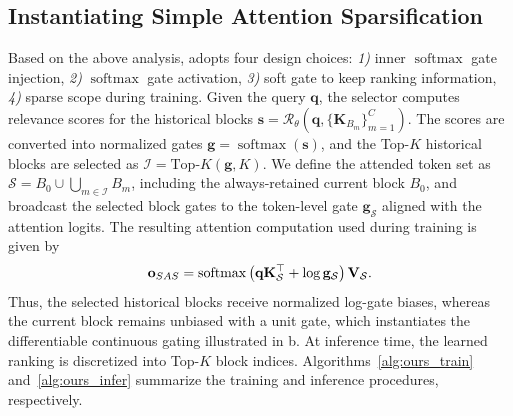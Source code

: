 \subsection{Instantiating Simple Attention Sparsification}
\label{sec:ranksparse}

Based on the above analysis, \our adopts four design choices: \emph{1)} inner $\operatorname{softmax}$ gate injection, \emph{2)} $\operatorname{softmax}$ gate activation, \emph{3)} soft gate to keep ranking information, \emph{4)} sparse scope during training.
Given the query $\mathbf{q}$, the selector computes relevance scores for the historical blocks
$\mathbf{s}
=
\mathcal{R}_{\theta}
\left(
\mathbf{q},
\{\mathbf{K}_{B_m}\}_{m=1}^{C}
\right).$
The scores are converted into normalized gates $\mathbf{g}=\operatorname{softmax}(\mathbf{s})$, and the Top-$K$ historical blocks are selected as $\mathcal{I}=\text{Top-}K(\mathbf{g},K)$. We define the attended token set as $\mathcal{S}=B_0\cup\bigcup_{m\in\mathcal{I}}B_m$, including the always-retained current block $B_0$, and broadcast the selected block gates to the token-level gate $\mathbf{g}_{\mathcal{S}}$ aligned with the attention logits. The resulting attention computation used during training is given by
\begin{equation}
\mathbf{o}_{SAS}
=
\operatorname{softmax}
\left(
    \mathbf{q}\mathbf{K}^{\top}_{\mathcal{S}}
    +
    \log\mathbf{g}_{\mathcal{S}}
\right)
\mathbf{V}_{\mathcal{S}}.
\label{eq:ours_train}
\end{equation}
Thus, the selected historical blocks receive normalized log-gate biases, whereas the current block remains unbiased with a unit gate, which instantiates the differentiable continuous gating illustrated in b.
At inference time, the learned ranking is discretized into Top-$K$ block indices.
Algorithms~\ref{alg:ours_train} and~\ref{alg:ours_infer} summarize the training and inference procedures, respectively.

